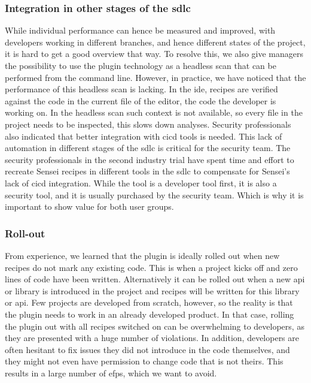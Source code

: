 \subsubsection{Integration in other stages of the \gls{sdlc}}
While individual performance can hence be measured and improved, with developers working in different branches, and hence different states of the project, it is hard to get a good overview that way.
To resolve this, we also give managers the possibility to use the plugin technology as a headless scan that can be performed from the command line.
However, in practice, we have noticed that the performance of this headless scan is lacking.
In the \gls{ide}, recipes are verified against the code in the current file of the editor, the code the developer is working on.
In the headless scan such context is not available, so every file in the project needs to be inspected, this slows down analyses.
Security professionals also indicated that better integration with \gls{cicd} tools is needed.
This lack of automation in different stages of the \gls{sdlc} is critical for the security team.
The security professionals in the second industry trial have spent time and effort to recreate Sensei recipes in different tools in the \gls{sdlc} to compensate for Sensei's lack of \gls{cicd} integration.
While the tool is a developer tool first, it is also a security tool, and it is usually purchased by the security team.
Which is why it is important to show value for both user groups.

\subsubsection{Roll-out}
From experience, we learned that the plugin is ideally rolled out when new recipes do not mark any existing code.
This is when a project kicks off and zero lines of code have been written. 
Alternatively it can be rolled out when a new \gls{api} or library is introduced in the project and recipes will be written for this library or \gls{api}.
Few projects are developed from scratch, however, so the reality is that the plugin needs to work in an already developed product.
In that case, rolling the plugin out with all recipes switched on can be overwhelming to developers, as they are presented with a huge number of violations.
In addition, developers are often hesitant to fix issues they did not introduce in the code themselves, and they might not even have permission to change code that is not theirs.
This results in a large number of \glspl{efp}, which we want to avoid.

